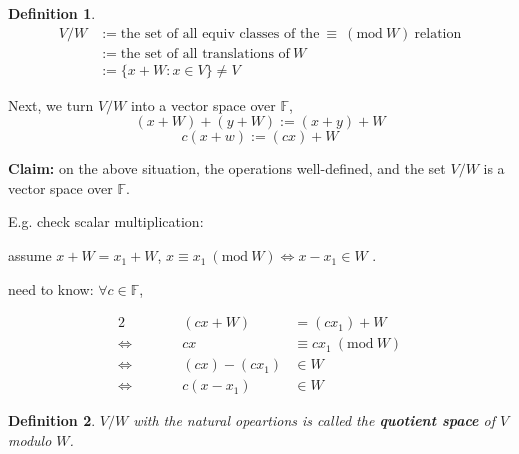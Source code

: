 \documentclass[12pt]{article}
\newtheorem{definition}{Definition}[subsection]
\newcommand{\mF}{{\mathbb{F}}}
\newcommand{\Mod}[1]{\ (\mathrm{mod}\ #1)}
\begin{document}
	\begin{definition}
		\begin{align*}
		V / W 
		&:= \text{the set of all equiv classes of the}\  \equiv \Mod W \ 
			\text{relation}\\
		&:= \text{the set of all translations of} \ W\\
		&:= \{x + W: x \in V\} \neq V
	\end{align*}		
	\end{definition}


	Next, we turn $V/W$ into a vector space over $\mF$, 
	\[
		(x + W) + (y + W) := (x + y) + W
	\]
	\[
		c (x + w) := (cx) + W
	\]
	
	\textbf{Claim:} on the above situation, the operations well-defined,
	and the set $V/W$ is a vector space over $\mF$. 

	E.g. check scalar multiplication: 

	assume $x + W = x_1 + W$, $x \equiv x_1 \Mod W \iff x - x_1 \in W$ . 

	need to know: $\forall c \in \mF$, 

	\begin{alignat*}{2}
					&	\qquad &	(cx + W)	&	= (cx_1) + W\\
	\Leftrightarrow &	\qquad &	cx			&	\equiv c x_1 \Mod W\\
	\Leftrightarrow &	\qquad &	(cx)-(cx_1) &	\in W\\
	\Leftrightarrow &	\qquad &	c(x-x_1)	&	\in W
	\end{alignat*}

	\begin{definition}
		$V/W$ with the natural opeartions is called the \textbf{quotient
		space} of $V$ modulo $W$. 
	\end{definition}



	


\end{document}
